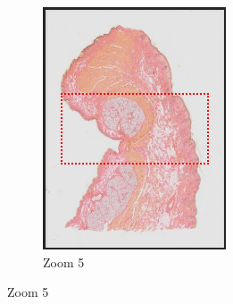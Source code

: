 \documentclass[a4paper,11pt]{report}
\numberwithin{figure}{chapter} %
\begin{document}
\begin{itemize}
\begin{figure}[H]
\begin{subfigure}[b]{0.3\textwidth}
            \includegraphics[width=\textwidth]{images/zooms3.png}
            \caption{Zoom 5}
            \end{subfigure}


\end{figure}
\end{itemize}
\end{document}
